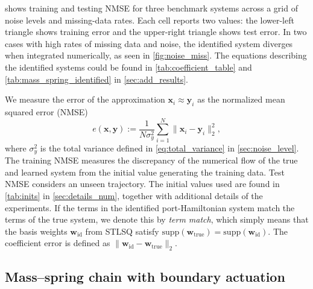 \documentclass[11pt, a4paper]{article}
\theoremstyle{plain}
\theoremstyle{definition}
\theoremstyle{remark}
\begin{document}
 shows training and testing NMSE for three benchmark systems across a grid of noise levels and missing-data rates. Each cell reports two values: the lower-left triangle shows training error and the upper-right triangle shows test error. In two cases with high rates of missing data and noise, the identified system diverges when integrated numerically, as seen in \cref{fig:noise_miss}. The equations describing the identified systems could be found in \cref{tab:coefficient_table} and \cref{tab:mass_spring_identified} in \cref{sec:add_results}.


We measure the error of the approximation $\mathbf{x}_i \approx \mathbf{y}_i$ as the normalized mean squared error (NMSE)
\begin{equation*}
    e(\mathbf{x},\mathbf{y}) := \frac{1}{N \sigma_y^2 }\sum_{i=1}^N  \| \mathbf{x}_i - \mathbf{y}_i \|_2^2,
\end{equation*}
where $\sigma_y^2$ is the total variance defined in \eqref{eq:total_variance} in \cref{sec:noise_level}. The training NMSE measures the discrepancy of the numerical flow of the true and learned system from the initial value generating the training data. Test NMSE considers an unseen trajectory. The initial values used are found in \cref{tab:inits} in \cref{sec:details_num}, together with additional details of the experiments. If the terms in the identified port-Hamiltonian system match the terms of the true system, we denote this by \textit{term match}, which simply means that the basis weights $\mathbf{w}_{\mathrm{id}}$ from STLSQ satisfy $\mathrm{supp}(\mathbf{w}_{\mathrm{true}}) = \mathrm{supp}(\mathbf{w}_{\mathrm{id}})$. The coefficient error is defined as 
$\|\mathbf{w}_{\mathrm{id}}-\mathbf{w}_{\mathrm{true}}\|_2$.



\subsection{Mass--spring chain with boundary actuation}\label{subsec:msd_chain_2n}
\end{document}
